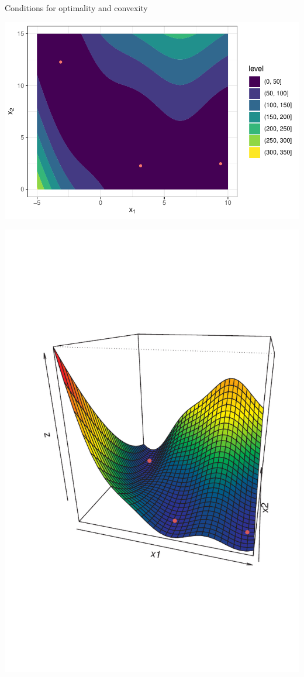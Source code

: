 \documentclass[11pt,compress,t,notes=noshow, xcolor=table]{beamer}
\begin{document}
\begin{vbframe}{Conditions for optimality and convexity}
\begin{center}
    \begin{minipage}[c]{0.4\textwidth}
        \includegraphics[width=\textwidth]{figure_man/branin3d/branin2D.pdf}
    \end{minipage}
    \begin{minipage}[c]{0.4\textwidth}
        \includegraphics[width=\textwidth]{figure_man/branin3d/branin3D.pdf}
    \end{minipage}
\end{center}


\end{vbframe}
\end{document}
